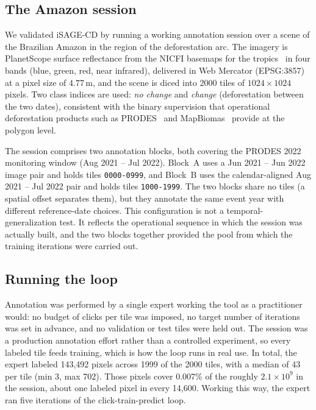 
\subsection{The Amazon session}
\label{sec:val_session}

We validated iSAGE-CD by running a working annotation session over
a scene of the Brazilian Amazon in the region of the deforestation
arc. The imagery is PlanetScope surface reflectance from the NICFI
basemaps for the tropics~\cite{nicfi2021basemaps} in four bands
(blue, green, red, near infrared), delivered in Web Mercator
(EPSG:3857) at a pixel size of 4.77\,m, and the scene is diced into
2000 tiles of $1024 \times 1024$ pixels.
Two class indices are used: \emph{no change} and \emph{change}
(deforestation between the two dates), consistent with the binary
supervision that operational deforestation products such as
PRODES~\cite{prodes} and MapBiomas~\cite{mapbiomas} provide at the polygon level.

The session comprises two annotation blocks, both covering the
PRODES 2022 monitoring window (Aug 2021 -- Jul 2022). Block~A uses
a Jun 2021 -- Jun 2022 image pair and holds tiles
\texttt{0000-0999}, and Block~B uses the calendar-aligned Aug 2021
-- Jul 2022 pair and holds tiles \texttt{1000-1999}. The two
blocks share no tiles (a spatial offset separates them), but they
annotate the same event year with different reference-date
choices. This configuration is not a temporal-generalization
test. It reflects the operational sequence in which the session
was actually built, and the two blocks together provided the pool
from which the training iterations were carried out.

\subsection{Running the loop}
\label{sec:val_convergence}

Annotation was performed by a single expert working the tool as a
practitioner would: no budget of clicks per tile was imposed, no
target number of iterations was set in advance, and no validation
or test tiles were held out. The session was a production
annotation effort rather than a controlled experiment, so every
labeled tile feeds training, which is how the loop runs in real
use. In total, the expert labeled 143{,}492 pixels across 1999 of
the 2000 tiles, with a median of 43 per tile (min 3, max 702).
Those pixels cover 0.007\% of the roughly $2.1\times10^{9}$ in the
session, about one labeled pixel in every 14{,}600. Working this
way, the expert ran five iterations of the click-train-predict
loop.


